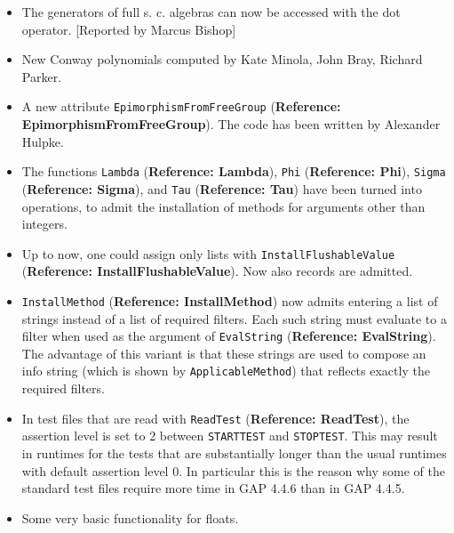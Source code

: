 \documentclass[a4paper,11pt]{report}
\begin{document}
{{\begin{itemize}
This method allows one to specify the amount of work to be spent on looking
for factors. 
\item  The generators of full s. c. algebras can now be accessed with the dot
operator. [Reported by Marcus Bishop] 
\item  New Conway polynomials computed by Kate Minola, John Bray, Richard Parker. 
\item  A new attribute \texttt{EpimorphismFromFreeGroup} (\textbf{Reference: EpimorphismFromFreeGroup}). The code has been written by Alexander Hulpke. 
\item  The functions \texttt{Lambda} (\textbf{Reference: Lambda}), \texttt{Phi} (\textbf{Reference: Phi}), \texttt{Sigma} (\textbf{Reference: Sigma}), and \texttt{Tau} (\textbf{Reference: Tau}) have been turned into operations, to admit the installation of methods for
arguments other than integers. 
\item  Up to now, one could assign only lists with \texttt{InstallFlushableValue} (\textbf{Reference: InstallFlushableValue}). Now also records are admitted. 
\item  \texttt{InstallMethod} (\textbf{Reference: InstallMethod}) now admits entering a list of strings instead of a list of required filters.
Each such string must evaluate to a filter when used as the argument of \texttt{EvalString} (\textbf{Reference: EvalString}). The advantage of this variant is that these strings are used to compose an
info string (which is shown by \texttt{ApplicableMethod}) that reflects exactly the required filters. 
\item  In test files that are read with \texttt{ReadTest} (\textbf{Reference: ReadTest}), the assertion level is set to 2 between \texttt{START{\textunderscore}TEST} and \texttt{STOP{\textunderscore}TEST}. This may result in runtimes for the tests that are substantially longer than
the usual runtimes with default assertion level 0. In particular this is the
reason why some of the standard test files require more time in \textsf{GAP} 4.4.6 than in \textsf{GAP} 4.4.5. 
\item  Some very basic functionality for floats. 
\end{itemize}
 }

  
}
\end{document}
